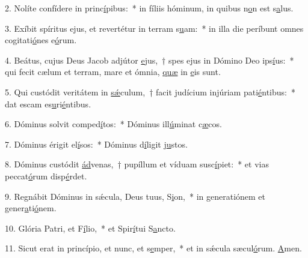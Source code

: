 2. Nolíte confídere in princ\uline{í}pibus:~* in fíliis hóminum, in quibus n\uline{o}n est s\uline{a}lus.\par 
3. Exíbit spíritus ejus, et revertétur in terram s\uline{u}am:~* in illa die períbunt omnes cogitati\uline{ó}nes e\uline{ó}rum.\par 
4. Beátus, cujus Deus Jacob adjútor \uline{e}jus,~† spes ejus in Dómino Deo ips\uline{í}us:~* qui fecit cælum et terram, mare et ómnia, \uline{quæ} in \uline{e}is sunt.\par 
5. Qui custódit veritátem in \uline{sǽ}culum,~† facit judícium injúriam pati\uline{é}ntibus:~* dat escam es\uline{u}ri\uline{é}ntibus.\par 
6. Dóminus solvit comped\uline{í}tos:~* Dóminus ill\uline{ú}minat c\uline{æ}cos.\par 
7. Dóminus érigit el\uline{í}sos:~* Dóminus d\uline{í}ligit j\uline{u}stos.\par 
8. Dóminus custódit \uline{ád}venas,~† pupíllum et víduam susc\uline{í}piet:~* et vias peccat\uline{ó}rum disp\uline{é}rdet.\par 
9. Regnábit Dóminus in sǽcula, Deus tuus, S\uline{i}on,~* in generatiónem et gener\uline{a}ti\uline{ó}nem.\par 
10. Glória Patri, et F\uline{í}lio,~* et Spir\uline{í}tui S\uline{a}ncto.\par 
11. Sicut erat in princípio, et nunc, et s\uline{e}mper,~* et in sǽcula sæcul\uline{ó}rum. \uline{A}men.\par 
